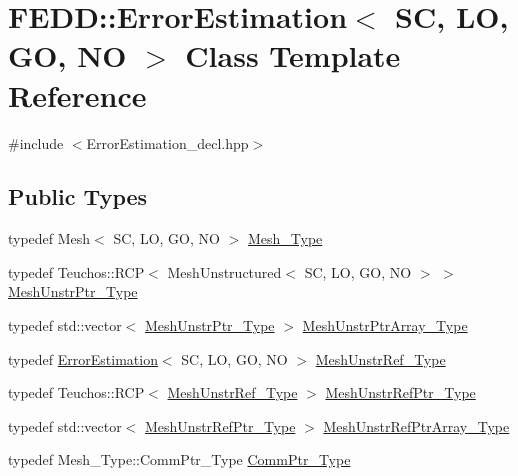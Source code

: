 \hypertarget{classFEDD_1_1ErrorEstimation}{}\section{F\+E\+DD\+:\+:Error\+Estimation$<$ SC, LO, GO, NO $>$ Class Template Reference}
\label{classFEDD_1_1ErrorEstimation}


{\ttfamily \#include $<$Error\+Estimation\+\_\+decl.\+hpp$>$}

\subsection*{Public Types}
\begin{DoxyCompactItemize}
\item 
typedef Mesh$<$ SC, LO, GO, NO $>$ \hyperlink{classFEDD_1_1ErrorEstimation_a6e55e8a488e7f9db2325d530dfacada5}{Mesh\+\_\+\+Type}
\item 
typedef Teuchos\+::\+R\+CP$<$ Mesh\+Unstructured$<$ SC, LO, GO, NO $>$ $>$ \hyperlink{classFEDD_1_1ErrorEstimation_a862043dc355a1524640b5ef53e8eefa1}{Mesh\+Unstr\+Ptr\+\_\+\+Type}
\item 
typedef std\+::vector$<$ \hyperlink{classFEDD_1_1ErrorEstimation_a862043dc355a1524640b5ef53e8eefa1}{Mesh\+Unstr\+Ptr\+\_\+\+Type} $>$ \hyperlink{classFEDD_1_1ErrorEstimation_ad64dcc59dd00c37ff85f641e52644916}{Mesh\+Unstr\+Ptr\+Array\+\_\+\+Type}
\item 
typedef \hyperlink{classFEDD_1_1ErrorEstimation}{Error\+Estimation}$<$ SC, LO, GO, NO $>$ \hyperlink{classFEDD_1_1ErrorEstimation_a3203c49d7cd9ee1089dde9ef83d17c58}{Mesh\+Unstr\+Ref\+\_\+\+Type}
\item 
typedef Teuchos\+::\+R\+CP$<$ \hyperlink{classFEDD_1_1ErrorEstimation_a3203c49d7cd9ee1089dde9ef83d17c58}{Mesh\+Unstr\+Ref\+\_\+\+Type} $>$ \hyperlink{classFEDD_1_1ErrorEstimation_a541e398a65d9618f8f316a941b57f5cb}{Mesh\+Unstr\+Ref\+Ptr\+\_\+\+Type}
\item 
typedef std\+::vector$<$ \hyperlink{classFEDD_1_1ErrorEstimation_a541e398a65d9618f8f316a941b57f5cb}{Mesh\+Unstr\+Ref\+Ptr\+\_\+\+Type} $>$ \hyperlink{classFEDD_1_1ErrorEstimation_a007f3451c1ea266178a87e3649f29e97}{Mesh\+Unstr\+Ref\+Ptr\+Array\+\_\+\+Type}
\item 
typedef Mesh\+\_\+\+Type\+::\+Comm\+Ptr\+\_\+\+Type \hyperlink{classFEDD_1_1ErrorEstimation_ac5689e70e0c965f5373f2a716c0250c1}{Comm\+Ptr\+\_\+\+Type}
\item 

\end{DoxyCompactItemize}
